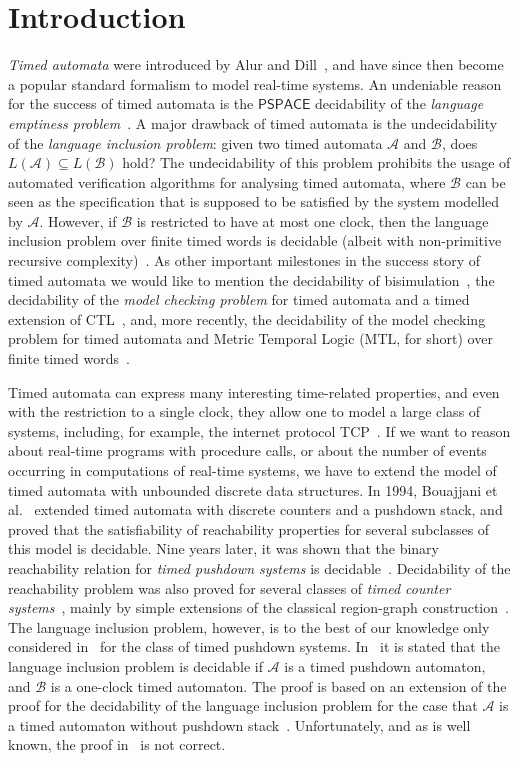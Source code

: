 \documentclass{CSML}
\theoremstyle{plain}\newtheorem{theorem}[thm]{Theorem}
\theoremstyle{plain}\newtheorem{corollary}[thm]{Corollary}
\theoremstyle{plain}\newtheorem{example}[thm]{Example}
\theoremstyle{plain}\newtheorem{lemma}[thm]{Lemma}
\theoremstyle{plain}\newtheorem{remark}[thm]{Remark}
\newcommand{\B}{\mathcal{B}}
\newcommand{\A}{\mathcal{A}}
\begin{document}
\section{Introduction}
\emph{Timed automata} were introduced by Alur and Dill~\cite{AD94}, and have since then become a popular standard formalism to model real-time systems. 
An undeniable reason for the success of timed automata is the $\mathsf{PSPACE}$ decidability of the \emph{language emptiness problem}~\cite{AD94}.
A major drawback of timed automata is the undecidability~\cite{AD94} of the \emph{language inclusion problem}: given two timed automata $\A$ and $\B$, does $L(\A)\subseteq L(\B)$ hold?
The undecidability of this problem prohibits the usage of automated verification algorithms for analysing timed automata, where $\B$ can be seen as the specification that is supposed to be satisfied by the system modelled by $\A$. 
However, if $\B$ is restricted to have at most one clock, then the language inclusion problem over finite timed words is decidable (albeit with non-primitive recursive complexity)~\cite{DBLP:conf/lics/OuaknineW04}.
As other important milestones in the success story of timed automata we would like to mention the decidability of bisimulation~\cite{DBLP:conf/cav/Cerans92}, 
the decidability of the \emph{model checking problem} for timed automata and a timed extension of CTL~\cite{DBLP:conf/lics/HenzingerNSY92}, and, more recently,  the decidability of the model checking problem for timed automata and Metric Temporal Logic (MTL, for short) over finite timed words~\cite{DBLP:conf/lics/OuaknineW05}.

Timed automata can express many interesting time-related properties, and even with the restriction to a single clock, they  allow one to model a large class of systems, including, for example, the internet protocol TCP~\cite{TCP}.  
If we want to reason about real-time programs with procedure calls, or about the number of events occurring in computations of real-time systems, we have to extend the model of timed automata with unbounded discrete data structures. In 1994, Bouajjani et al.~\cite{DBLP:conf/hybrid/BouajjaniER94} extended timed automata with discrete counters and a pushdown stack, and proved that the satisfiability of reachability properties for several subclasses of this model is decidable. 
Nine years later, it was shown that the binary reachability relation for \emph{timed pushdown systems} is decidable~\cite{DBLP:journals/tcs/Dang03}.  Decidability of the reachability problem was also proved for several classes of \emph{timed counter systems}~\cite{DBLP:journals/entcs/BouchyFS09}, mainly by simple extensions of the classical region-graph construction~\cite{AD94}. 
The language inclusion problem, however, is to the best of our knowledge only considered in~\cite{EmmiM06} for the class of timed pushdown systems. 
In~\cite{EmmiM06} it is stated that the language inclusion problem is decidable if $\A$ is a timed pushdown automaton, and $\B$ is a one-clock timed automaton. 
The proof is based on an extension of the proof for the decidability of the language inclusion problem for the case that $\A$ is a timed automaton without pushdown stack~\cite{DBLP:conf/lics/OuaknineW04}. 
Unfortunately, and as is well known, the proof in~\cite{EmmiM06} is not correct. 
\end{document}
